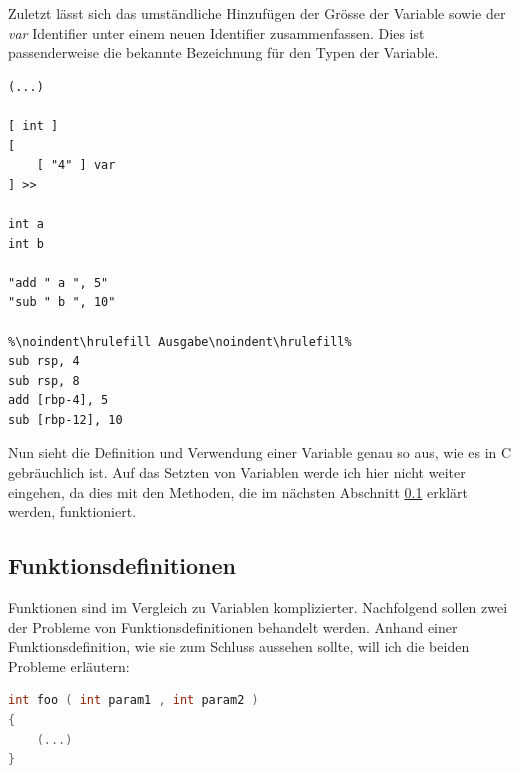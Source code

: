 Zuletzt lässt sich das umständliche Hinzufügen der Grösse der Variable sowie der \textit{var} Identifier unter einem neuen Identifier zusammenfassen. Dies ist passenderweise die bekannte Bezeichnung für den Typen der Variable.

\begin{lstlisting}[language=QHS, caption=Definition einer Variable mit \textit{int} Identifier]
(...)

[ int ] 
[
    [ "4" ] var
] >>
    
int a 
int b 
    
"add " a ", 5"
"sub " b ", 10"
        
%\noindent\hrulefill Ausgabe\noindent\hrulefill%
sub rsp, 4
sub rsp, 8
add [rbp-4], 5
sub [rbp-12], 10
\end{lstlisting}

Nun sieht die Definition und Verwendung einer Variable genau so aus, wie es in C gebräuchlich ist.
Auf das Setzten von Variablen werde ich hier nicht weiter eingehen, da dies mit den Methoden, die im nächsten Abschnitt \ref{sec:qhs-funcs} erklärt werden, funktioniert.

\subsection{Funktionsdefinitionen} \label{sec:qhs-funcs}
Funktionen sind im Vergleich zu Variablen komplizierter. Nachfolgend sollen zwei der Probleme von Funktionsdefinitionen behandelt werden.
Anhand einer Funktionsdefinition, wie sie zum Schluss aussehen sollte, will ich die beiden Probleme erläutern:

\begin{lstlisting}[language=C, label=eg:qhs-function_goal, caption=Ziel für die Definition einer Funktion in QHS]
int foo ( int param1 , int param2 )
{
    (...)
}
\end{lstlisting}

